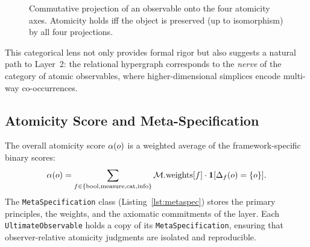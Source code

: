 \begin{figure}[htbp]
\centering
{}
\caption{Commutative projection of an observable onto the four atomicity axes. Atomicity holds iff the object is preserved (up to isomorphism) by all four projections.}
\label{fig:commutative}
\end{figure}

This categorical lens not only provides formal rigor but also suggests a natural path to Layer~2: the relational hypergraph corresponds to the \emph{nerve} of the category of atomic observables, where higher-dimensional simplices encode multi-way co-occurrences.

\subsection{Atomicity Score and Meta-Specification}

The overall atomicity score $\alpha(o)$ is a weighted average of the framework-specific binary scores:
\[
\alpha(o) = \sum_{f \in \{\text{bool}, \text{measure}, \text{cat}, \text{info}\}} \mathcal{M}.\text{weights}[f] \cdot \mathbf{1}[\Delta_f(o) = \{o\}].
\]
The \texttt{MetaSpecification} class (Listing~\ref{lst:metaspec}) stores the primary principles, the weights, and the axiomatic commitments of the layer. Each \texttt{UltimateObservable} holds a copy of its \texttt{MetaSpecification}, ensuring that observer-relative atomicity judgments are isolated and reproducible.

